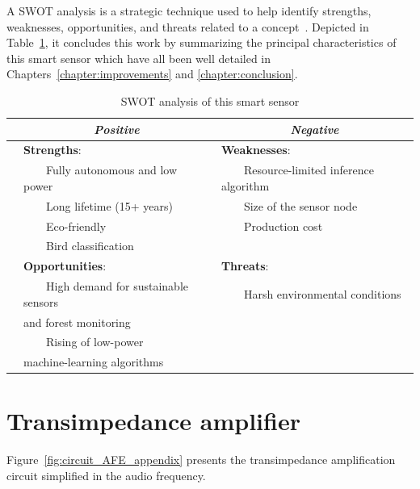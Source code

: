 \documentclass{EPL-master-thesis-covers-EN}
\newcommand{\tabitem}{~~\llap{\textbullet}~~}
\begin{document}
A SWOT analysis is a strategic technique used to help  identify strengths, weaknesses, opportunities, and threats related to a concept~\cite{HILL199746}. Depicted in Table~\ref{tab:SWOT}, it concludes this work by summarizing the principal characteristics of this smart sensor which have all been well detailed in Chapters~\ref{chapter:improvements} and \ref{chapter:conclusion}.

\begin{table}[H]
\centering
 \begin{tabular}{p{}|p{}|p{}}
 & \multicolumn{1}{c|}{\textit{Positive}} & \multicolumn{1}{c}{\textit{Negative}} \\ \midrule
 \parbox[t]{3mm}{} 
 & \textbf{Strengths}: & \textbf{Weaknesses}:\\
 & \tabitem Fully autonomous and low power & \tabitem Resource-limited inference algorithm\\
 & \tabitem Long lifetime (15+ years) & \tabitem Size of the sensor node\\
 & \tabitem Eco-friendly & \tabitem Production cost\\
 & \tabitem Bird classification & \\
 \midrule
\parbox[t]{3mm}{}
 & \textbf{Opportunities}: & \textbf{Threats}:\\
 & \tabitem High demand for sustainable sensors & \tabitem Harsh environmental conditions\\
 & \hspace{4mm} and forest monitoring & \\
 & \tabitem Rising of low-power & \\
 & \hspace{4mm} machine-learning algorithms & \\
 \end{tabular}
\caption{SWOT analysis of this smart sensor}
\label{tab:SWOT}
\end{table}


\appendix

\chapter{Transimpedance amplifier}
\label{appendix:transimpedance}

Figure~\ref{fig:circuit_AFE_appendix} presents the transimpedance amplification circuit simplified in the audio frequency.
\end{document}
